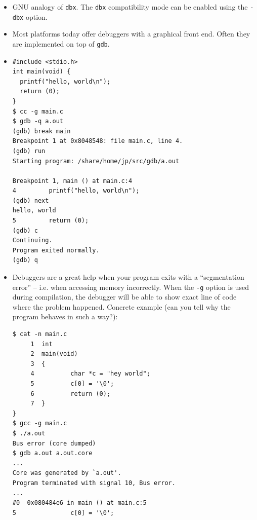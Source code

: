 \begin{itemize}
\item GNU analogy of \texttt{dbx}. The \texttt{dbx} compatibility mode can be
enabled using the \texttt{-dbx} option.
\item Most platforms today offer debuggers with a graphical front end. Often they
are implemented on top of \texttt{gdb}.

\item \begin{verbatim}
#include <stdio.h>
int main(void) {
  printf("hello, world\n");
  return (0);
}
$ cc -g main.c 
$ gdb -q a.out
(gdb) break main
Breakpoint 1 at 0x8048548: file main.c, line 4.
(gdb) run
Starting program: /share/home/jp/src/gdb/a.out 

Breakpoint 1, main () at main.c:4
4         printf("hello, world\n");
(gdb) next
hello, world
5         return (0);
(gdb) c
Continuing.
Program exited normally.
(gdb) q
\end{verbatim}
\item Debuggers are a great help when your program exits with a
``segmentation error'' -- i.e. when accessing memory incorrectly.
When the \texttt{-g} option is used during compilation, the debugger will be able to
show exact line of code where the problem happened.
Concrete example (can you tell why the program behaves in such a way?):
\begin{verbatim}
$ cat -n main.c
     1  int
     2  main(void)
     3  {
     4          char *c = "hey world";
     5          c[0] = '\0';
     6          return (0);
     7  }
}
$ gcc -g main.c
$ ./a.out
Bus error (core dumped)
$ gdb a.out a.out.core
...
Core was generated by `a.out'.
Program terminated with signal 10, Bus error.
...
#0  0x080484e6 in main () at main.c:5
5               c[0] = '\0';
\end{verbatim}
\end{itemize}

\pagebreak
{}

\begin{slide}
\end{slide}



